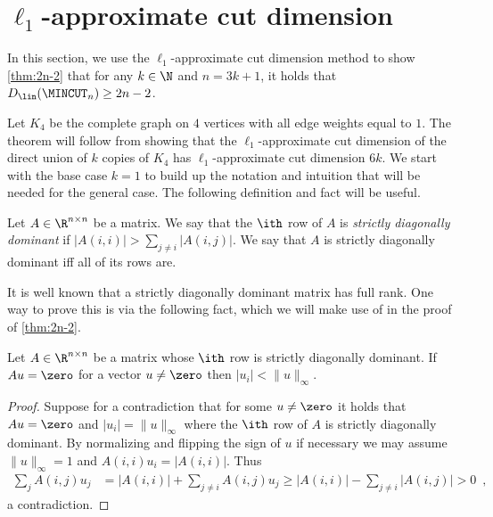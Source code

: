 \setcounter{section}{6}\setcounter{theorem}{36}\section{$\ell_1$-approximate cut dimension}
\label{sec:l1-approx}
\label{sec:approx_construction}
In this section, we use the $\ell_1$-approximate cut dimension method to show \cref{thm:2n-2} that
for any $k \in \N$ and $n = 3k+1$, it holds that $D_\lin(\MINCUT_n) \ge 2n-2$.

Let $K_4$ be the complete graph on $4$ vertices with all edge weights equal to $1$.
The theorem will follow from showing that the $\ell_1$-approximate cut dimension of
the direct union of $k$ copies of $K_4$ has $\ell_1$-approximate cut dimension $6k$.
We start with the base case $k=1$ to build up the notation and intuition that will be needed
for the general case.  The following definition and fact will be useful.

\begin{definition}
Let $A \in \R^{n \times n}$ be a matrix.  We say that the $\ith$ row of $A$ is \emph{strictly diagonally dominant}
if $|A(i,i)| > \sum_{j \ne i} |A(i,j)|$.  We say that $A$ is strictly diagonally dominant iff all of its rows are.
\end{definition}

It is well known that a strictly diagonally dominant matrix has full rank.
One way to prove this is via the following fact, which we will make use of in the proof of \cref{thm:2n-2}.
\begin{fact}
\label{fact:sdd}
Let $A \in \R^{n \times n}$ be a matrix whose $\ith$ row is strictly diagonally dominant.
If $A u = \zero$ for a vector $u \ne \zero$ then $|u_i| < \|u\|_\infty$.
\end{fact}

\begin{proof}
Suppose for a contradiction that for some $u \ne \zero$ it holds that $A u = \zero$ and $|u_i| = \|u\|_\infty$
where the $\ith$ row of $A$ is strictly diagonally dominant.
By normalizing and flipping the sign of $u$ if necessary we may assume $\|u\|_\infty =1$ and $A(i,i) u_i = |A(i,i)|$.  Thus
\begin{align*}
\sum_j A(i,j) u_j &= |A(i,i)| + \sum_{j \ne i} A(i,j) u_j \ge |A(i,i)| - \sum_{j \ne i} |A(i,j)| > 0 \enspace ,
\end{align*}
a contradiction.
\end{proof}


